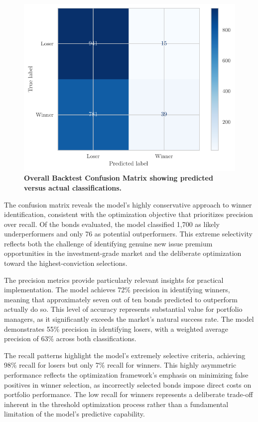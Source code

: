 \begin{figure}[h]
    \begin{center}
        \includegraphics[width=\textwidth]{images/confusion_matrix.pdf}
    \end{center}
    \caption{\textbf{Overall Backtest Confusion Matrix showing predicted versus actual classifications.}}
    \label{fig:confusion_matrix}
\end{figure}

The confusion matrix reveals the model's highly conservative approach to winner identification, consistent with the optimization objective that prioritizes precision over recall. Of the bonds evaluated, the model classified 1,700 as likely underperformers and only 76 as potential outperformers. This extreme selectivity reflects both the challenge of identifying genuine new issue premium opportunities in the investment-grade market and the deliberate optimization toward the highest-conviction selections.

The precision metrics provide particularly relevant insights for practical implementation. The model achieves 72\% precision in identifying winners, meaning that approximately seven out of ten bonds predicted to outperform actually do so. This level of accuracy represents substantial value for portfolio managers, as it significantly exceeds the market's natural success rate. The model demonstrates 55\% precision in identifying losers, with a weighted average precision of 63\% across both classifications.

The recall patterns highlight the model's extremely selective criteria, achieving 98\% recall for losers but only 7\% recall for winners. This highly asymmetric performance reflects the optimization framework's emphasis on minimizing false positives in winner selection, as incorrectly selected bonds impose direct costs on portfolio performance. The low recall for winners represents a deliberate trade-off inherent in the threshold optimization process rather than a fundamental limitation of the model's predictive capability.

